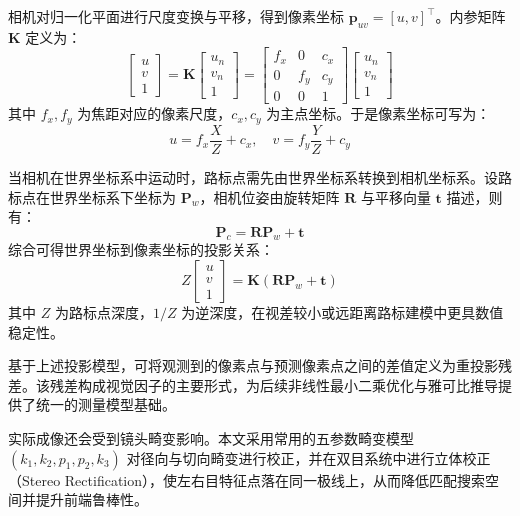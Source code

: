 相机对归一化平面进行尺度变换与平移，得到像素坐标 $\mathbf{p}_{uv} = [u, v]^\top$。内参矩阵 $\mathbf{K}$ 定义为：
\begin{equation}
    \begin{bmatrix} u \\ v \\ 1 \end{bmatrix}
    = \mathbf{K} \begin{bmatrix} u_n \\ v_n \\ 1 \end{bmatrix}
    = \begin{bmatrix} f_x & 0 & c_x \\ 0 & f_y & c_y \\ 0 & 0 & 1 \end{bmatrix}
    \begin{bmatrix} u_n \\ v_n \\ 1 \end{bmatrix}
\end{equation}
其中 $f_x, f_y$ 为焦距对应的像素尺度，$c_x, c_y$ 为主点坐标。于是像素坐标可写为：
\begin{equation}
    u = f_x \frac{X}{Z} + c_x, \quad v = f_y \frac{Y}{Z} + c_y
\end{equation}

当相机在世界坐标系中运动时，路标点需先由世界坐标系转换到相机坐标系。设路标点在世界坐标系下坐标为 $\mathbf{P}_w$，相机位姿由旋转矩阵 $\mathbf{R}$ 与平移向量 $\mathbf{t}$ 描述，则有：
\begin{equation}
    \mathbf{P}_c = \mathbf{R} \mathbf{P}_w + \mathbf{t}
\end{equation}
综合可得世界坐标到像素坐标的投影关系：
\begin{equation}
    Z \begin{bmatrix} u \\ v \\ 1 \end{bmatrix} = \mathbf{K} (\mathbf{R} \mathbf{P}_w + \mathbf{t})
\end{equation}
其中 $Z$ 为路标点深度，$1/Z$ 为逆深度，在视差较小或远距离路标建模中更具数值稳定性。

基于上述投影模型，可将观测到的像素点与预测像素点之间的差值定义为重投影残差。该残差构成视觉因子的主要形式，为后续非线性最小二乘优化与雅可比推导提供了统一的测量模型基础。

实际成像还会受到镜头畸变影响。本文采用常用的五参数畸变模型 $(k_1, k_2, p_1, p_2, k_3)$ 对径向与切向畸变进行校正，并在双目系统中进行立体校正（Stereo Rectification），使左右目特征点落在同一极线上，从而降低匹配搜索空间并提升前端鲁棒性。

